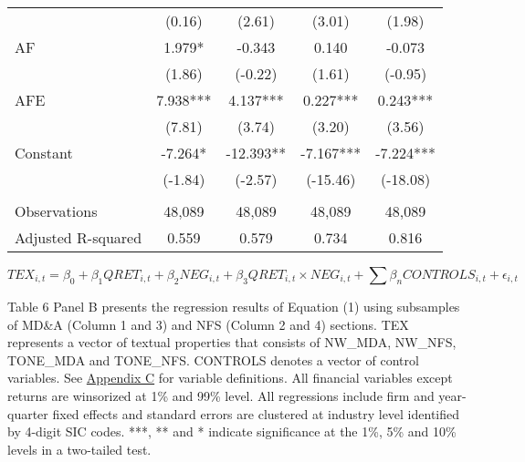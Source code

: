 \begin{table}[H]
\begin{center}
\begin{tabular}{lcccc}
			& (0.16) & (2.61) & (3.01) & (1.98) \\
			AF & 1.979* & -0.343 & 0.140 & -0.073 \\
			& (1.86) & (-0.22) & (1.61) & (-0.95) \\
			AFE & 7.938*** & 4.137*** & 0.227*** & 0.243*** \\
			& (7.81) & (3.74) & (3.20) & (3.56) \\
			Constant & -7.264* & -12.393** & -7.167*** & -7.224*** \\
			& (-1.84) & (-2.57) & (-15.46) & (-18.08) \\
			&   &   &   &  \\
			Observations & 48,089 & 48,089 & 48,089 & 48,089 \\
			Adjusted R-squared & 0.559 & 0.579 & 0.734 & 0.816 \\
			\bottomrule
			\bottomrule
		\end{tabular}%
	\end{center}
\begin{footnotesize}
	\setcounter{equation}{0}
	\begin{equation}
		TEX_{i,t}=\beta_0+\beta_1QRET_{i,t}+\beta_2NEG_{i,t}+\beta_3QRET_{i,t}\times NEG_{i,t}+\sum\beta_nCONTROLS_{i,t}+\epsilon_{i,t}
	\end{equation}
	
	\noindent Table 6 Panel B presents the regression results of Equation (1) using subsamples of MD\&A (Column 1 and 3) and NFS (Column 2 and 4) sections. TEX represents a vector of textual properties that consists of NW\_MDA, NW\_NFS, TONE\_MDA and TONE\_NFS. CONTROLS denotes a vector of control variables. See \hyperref[appc]{Appendix C} for variable definitions. All financial variables except returns are winsorized at 1\% and 99\% level. All regressions include firm and year-quarter fixed effects and standard errors are clustered at industry level identified by 4-digit SIC codes. ***, ** and * indicate significance at the 1\%, 5\% and 10\% levels in a two-tailed test.
\end{footnotesize}
\end{table}%